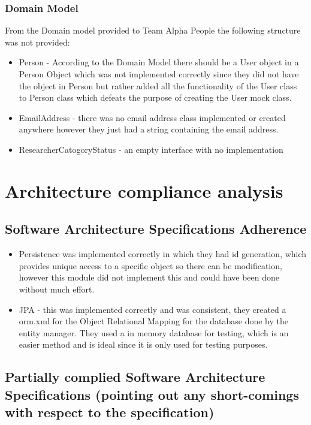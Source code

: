 \documentclass{article}
\begin{document}
	\subsubsection{Domain Model}
	From the Domain model provided to Team Alpha People the following structure was not provided:
	\begin{itemize}
		\item Person - According to the Domain Model there should be a User object in a Person Object which was not implemented correctly since they did not have the object in Person but rather added all the functionality of the User class to Person class which defeats the purpose of creating the User mock class.
		\item EmailAddress - there was no email address class implemented or created anywhere however they just had a string containing the email address.
		\item ResearcherCatogoryStatus - an empty interface with no implementation
	 \end{itemize}
	\newpage
\section{Architecture compliance analysis}
	\subsection{Software Architecture Specifications Adherence}
	\begin{itemize}

	    \item Persistence was implemented correctly in which they had id generation, which provides unique access to a specific object so there can be modification, however this module did not implement this and could have been done without much effort. 
		\item JPA - this was implemented correctly and was consistent, they created a orm.xml for the Object Relational Mapping for the database done by the entity manager. They used a in memory database for testing, which is an easier method and is ideal since it is only used for testing purposes.

	\end{itemize}

	\subsection{Partially complied Software Architecture Specifications (pointing out any short-comings with respect to the specification)}
\end{document}
